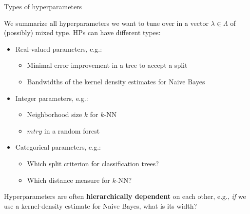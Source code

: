 \documentclass[11pt,compress,t,notes=noshow, xcolor=table]{beamer}
\begin{document}
\begin{vbframe}{Types of hyperparameters}

We summarize all hyperparameters we want to tune over in a vector $\lambda \in \Lambda$ of (possibly) mixed type. HPs can have different types: 

\begin{itemize}
\item Real-valued parameters, e.g.:
\begin{itemize}
\item Minimal error improvement in a tree to accept a split
\item Bandwidths of the kernel density estimates for Naive Bayes 
\end{itemize}
\item Integer parameters, e.g.:
\begin{itemize}
\item Neighborhood size $k$ for $k$-NN
\item $mtry$ in a random forest
\end{itemize}
\item Categorical parameters, e.g.:
\begin{itemize}
\item Which split criterion for classification trees?
\item Which distance measure for $k$-NN?
\end{itemize}
\end{itemize}

Hyperparameters are often \textbf{hierarchically dependent} on each other, e.g., \emph{if} we use 
a kernel-density estimate for Naive Bayes, what is its width? 
\end{vbframe}


\endlecture
\end{document}
